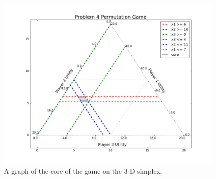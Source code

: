\documentclass{article}
\begin{document}
\begin{enumerate}
\begin{figure}[h!]
  \centering
  \includegraphics[width=.6\linewidth]{04-04}
  \caption{A graph of the core of the game on the 3-D simplex.}
  \label{fig:04}
\end{figure}
%
%
%
%
%
%
%
%
%
%
%
%
%


\end{enumerate}
\end{document}
